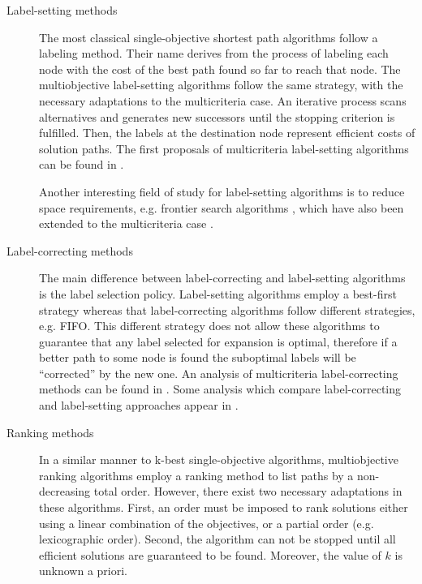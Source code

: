 \begin{description}

    \item[Label-setting methods] The most classical single-objective shortest path algorithms follow a labeling method. Their name derives from the process of labeling each node with the cost of the best path found so far to reach that node. The multiobjective label-setting algorithms follow the same strategy, with the necessary adaptations to the multicriteria case. An iterative process scans alternatives and generates new successors until the stopping criterion is fulfilled. Then, the labels at the destination node represent efficient costs of solution paths. The first proposals of multicriteria label-setting algorithms can be found in \citep{hansen1979,Martins1984a}. 
    
    Another interesting field of study for label-setting algorithms is to reduce space requirements, e.g. frontier search algorithms \citep{Korf2005}, which have also been extended to the multicriteria case \citep{Mandow2007, Mandow2008, Mandow2008a}.
    
    \item[Label-correcting methods] The main difference between label-correcting and label-setting algorithms is the label selection policy. Label-setting algorithms employ a best-first strategy whereas that label-correcting algorithms follow different strategies, e.g. FIFO. This different strategy does not allow these algorithms to guarantee that any label selected for expansion is optimal, therefore if a better path to some node is found the suboptimal labels will be ``corrected'' by the new one. An analysis of multicriteria label-correcting methods can be found in \citep{Brumbaugh-Smith1989}. Some analysis which compare label-correcting and label-setting approaches appear in \citep{skriverandersen2000, guerrieromusmanno2001, Paixao2007}.
       
    \item[Ranking methods] In a similar manner to k-best single-objective algorithms, multiobjective ranking algorithms employ a ranking method to list paths by a non-decreasing total order. However, there exist two necessary adaptations in these algorithms. First, an order must be imposed to rank solutions either using a linear combination of the objectives, or a partial order (e.g. lexicographic order). Second, the algorithm can not be stopped until all efficient solutions are guaranteed to be found. Moreover, the value of $k$ is unknown a priori. 
    

\end{description}
